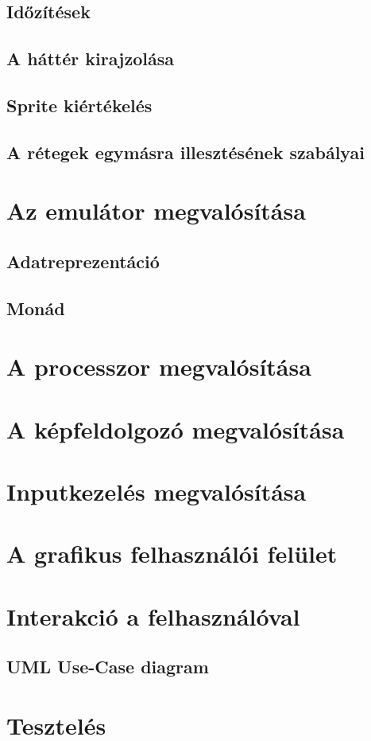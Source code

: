 \subsection{Időzítések}

\subsection{A háttér kirajzolása}

\subsection{Sprite kiértékelés}

\subsection{A rétegek egymásra illesztésének szabályai}

\section{Az emulátor megvalósítása}

\subsection{Adatreprezentáció}

\subsection{Monád}

\section{A processzor megvalósítása}

\section{A képfeldolgozó megvalósítása}

\section{Inputkezelés megvalósítása}

\section{A grafikus felhasználói felület}

\section{Interakció a felhasználóval}

\subsection{UML Use-Case diagram}

\section{Tesztelés}





